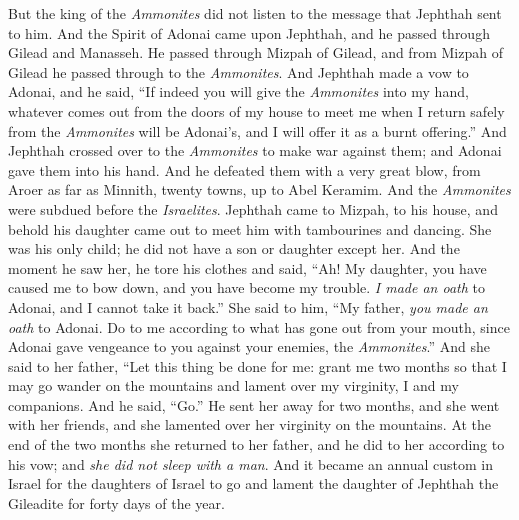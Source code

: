 \begin{biblechapter}
\verse But the king of the \textit{Ammonites} did not listen to the message that Jephthah sent to him.
 And the Spirit of Adonai came upon Jephthah, and he passed through Gilead and Manasseh. He passed through Mizpah of Gilead, and from Mizpah of Gilead he passed through to the \textit{Ammonites}.
\verse And Jephthah made a vow to Adonai, and he said, “If indeed you will give the \textit{Ammonites} into my hand,
\verse whatever comes out from the doors of my house to meet me when I return safely from the \textit{Ammonites} will be Adonai’s, and I will offer it as a burnt offering.”
\verse And Jephthah crossed over to the \textit{Ammonites} to make war against them; and Adonai gave them into his hand.
\verse And he defeated them with a very great blow, from Aroer as far as Minnith, twenty towns, up to Abel Keramim. And the \textit{Ammonites} were subdued before the \textit{Israelites}.
\verse Jephthah came to Mizpah, to his house, and behold his daughter came out to meet him with tambourines and dancing. She was his only child; he did not have a son or daughter except her.
\verse And the moment he saw her, he tore his clothes and said, “Ah! My daughter, you have caused me to bow down, and you have become my trouble. \textit{I made an oath} to Adonai, and I cannot take it back.”
\verse She said to him, “My father, \textit{you made an oath} to Adonai. Do to me according to what has gone out from your mouth, since Adonai gave vengeance to you against your enemies, the \textit{Ammonites}.”
\verse And she said to her father, “Let this thing be done for me: grant me two months so that I may go wander on the mountains and lament over my virginity, I and my companions.
\verse And he said, “Go.” He sent her away for two months, and she went with her friends, and she lamented over her virginity on the mountains.
\verse At the end of the two months she returned to her father, and he did to her according to his vow; and \textit{she did not sleep with a man}. And it became an annual custom in Israel
\verse for the daughters of Israel to go and lament the daughter of Jephthah the Gileadite for forty days of the year.
\end{biblechapter}

